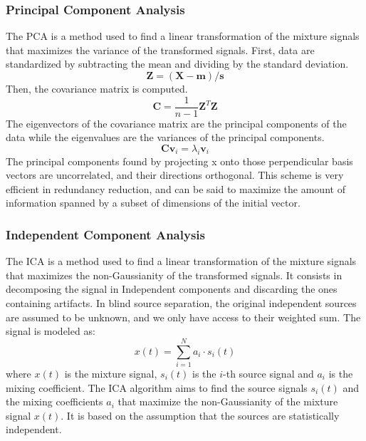 \documentclass[a4paper, noexaminfo]{sapthesis}
\begin{document}
\subsubsection{Principal Component Analysis}
The PCA\cite{pca} is a method used to find a linear transformation of the
mixture signals that maximizes the variance of the transformed signals. 
First, data are standardized by subtracting the mean and dividing by the
standard deviation.
\begin{equation}
\label{eq:pca}
\textbf{Z} = (\textbf{X} - \textbf{m})/\textbf{s}
\end{equation}
Then, the covariance matrix is computed. 
\begin{equation}
\label{eq:pca2}
\textbf{C} = \frac{1}{n-1}\textbf{Z}^T\textbf{Z}
\end{equation}
The eigenvectors of the covariance matrix are the principal components of the data while the
eigenvalues are the variances of the principal components.
\begin{equation}
\label{eq:pca3}
\textbf{C}\textbf{v}_i = \lambda_i\textbf{v}_i
\end{equation}
The principal components found by projecting x onto those
 perpendicular basis vectors are uncorrelated, and their directions 
 orthogonal. This scheme is very efficient in redundancy reduction,
  and can be said to maximize the amount of information spanned by a
subset of dimensions of the initial vector. \newline

\subsubsection{Independent Component Analysis}
The ICA\cite{ica} is a method used to find a linear transformation of the
mixture signals that maximizes the non-Gaussianity of the transformed signals.
It consists in decomposing the signal in Independent components and 
discarding the ones containing artifacts. In blind source separation, the original independent
sources are assumed to be unknown, and we only have
access to their weighted sum.\cite{ica2} \newline
The signal is modeled as:
\begin{equation}
\label{eq:ica}
x(t) = \sum_{i=1}^{N} a_i \cdot s_i(t)
\end{equation}
where $x(t)$ is the mixture signal, $s_i(t)$ is the $i$-th source signal
and $a_i$ is the mixing coefficient. \newline
The ICA algorithm aims to find the source signals $s_i(t)$ and the mixing
coefficients $a_i$ that maximize the non-Gaussianity of the mixture signal
$x(t)$. 
It is based on the assumption that the sources are statistically independent.
\newline
\end{document}
